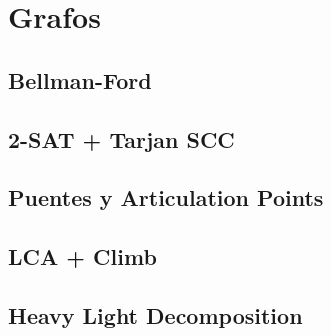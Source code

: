 \section{Grafos}%
\subsection{Bellman-Ford}
\subsection{2-SAT + Tarjan SCC}
\subsection{Puentes y Articulation Points}
\subsection{LCA + Climb}
\subsection{Heavy Light Decomposition}

